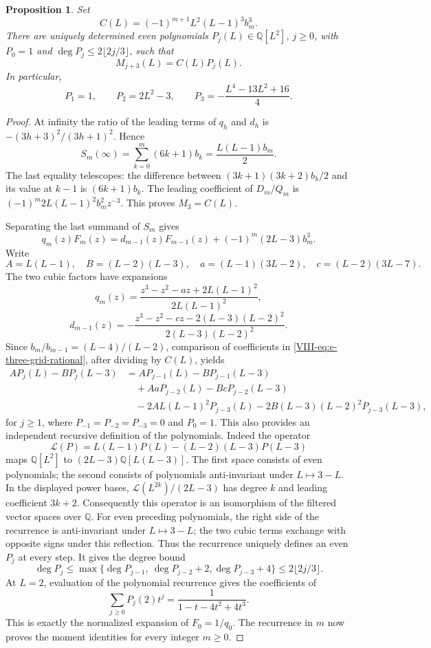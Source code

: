 \documentclass[11pt,letterpaper]{article}
\newtheorem{proposition}[theorem]{Proposition}
\numberwithin{equation}{section}
\begin{document}
\begin{proposition}\label{VIII-prop:e-three-grid-moments}
Set
\[
 C(L)=(-1)^{m+1}L^2(L-1)^3b_m^3.
\]
There are uniquely determined even polynomials $P_j(L)\in\mathbb Q[L^2]$,
$j\ge0$, with $P_0=1$ and $\deg P_j\le2\lfloor2j/3\rfloor$, such that
\[
 M_{j+3}(L)=C(L)P_j(L).
\]
In particular,
\[
 P_1=1,\qquad P_2=2L^2-3,\qquad
 P_3=-\frac{L^4-13L^2+16}{4}.
\]
\end{proposition}
\begin{proof}
At infinity the ratio of the leading terms of $q_h$ and $d_h$ is
$-(3h+3)^2/(3h+1)^2$. Hence
\[
 S_m(\infty)=\sum_{k=0}^m(6k+1)b_k
 =\frac{L(L-1)b_m}{2}.
\]
The last equality telescopes: the difference between
$(3k+1)(3k+2)b_k/2$ and its value at $k-1$ is $(6k+1)b_k$.
The leading coefficient of $D_m/Q_m$ is
$(-1)^m2L(L-1)^2b_m^2z^{-3}$. This proves $M_3=C(L)$.

Separating the last summand of $S_m$ gives
\begin{equation}\label{VIII-eq:e-three-grid-rational}
 q_m(z)F_m(z)=d_{m-1}(z)F_{m-1}(z)
                         +(-1)^m(2L-3)b_m^3.
\end{equation}
Write
\[
 A=L(L-1),\quad B=(L-2)(L-3),\quad
 a=(L-1)(3L-2),\quad c=(L-2)(3L-7).
\]
The two cubic factors have expansions
\[
 q_m(z)=\frac{z^3-z^2-az+2L(L-1)^2}{2L(L-1)^2},
\]
\[
 d_{m-1}(z)=
 -\frac{z^3-z^2-cz-2(L-3)(L-2)^2}{2(L-3)(L-2)^2}.
\]
Since $b_m/b_{m-1}=(L-4)/(L-2)$, comparison of coefficients in
\eqref{VIII-eq:e-three-grid-rational}, after dividing by $C(L)$, yields
\begin{align*}
 A P_j(L)-B P_j(L-3)
 &=A P_{j-1}(L)-B P_{j-1}(L-3)\\
 &\quad+A a P_{j-2}(L)-B c P_{j-2}(L-3)\\
 &\quad-2A L(L-1)^2P_{j-3}(L)
        -2B(L-3)(L-2)^2P_{j-3}(L-3),
\end{align*}
for $j\ge1$, where $P_{-1}=P_{-2}=P_{-3}=0$ and $P_0=1$.
This also provides an independent recursive definition of the
polynomials. Indeed the operator
\[
 \mathcal L(P)=L(L-1)P(L)-(L-2)(L-3)P(L-3)
\]
maps $\mathbb Q[L^2]$ to
$(2L-3)\mathbb Q[L(L-3)]$. The first space consists of even
polynomials; the second consists of polynomials anti-invariant
under $L\mapsto3-L$. In the displayed power bases,
$\mathcal L(L^{2k})/(2L-3)$ has degree $k$ and leading coefficient
$3k+2$. Consequently this operator is an isomorphism of the filtered
vector spaces over $\mathbb Q$.
For even preceding polynomials, the right side of the recurrence is
anti-invariant under $L\mapsto3-L$; the two cubic terms exchange
with opposite signs under this reflection. Thus the recurrence
uniquely defines an even $P_j$ at every step. It gives the degree bound
\[
 \deg P_j\le\max\{\deg P_{j-1},\ \deg P_{j-2}+2,
                                    \deg P_{j-3}+4\}
 \le2\lfloor2j/3\rfloor.
\]
At $L=2$, evaluation of the polynomial recurrence gives the
coefficients of
\[
 \sum_{j\ge0}P_j(2)t^j=\frac1{1-t-4t^2+4t^3}.
\]
This is exactly the normalized expansion of $F_0=1/q_0$.
The recurrence in $m$ now proves the moment identities for every
integer $m\ge0$.
\end{proof}
\end{document}
